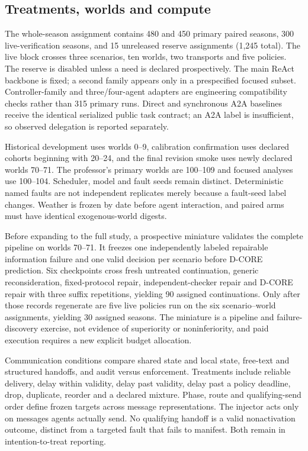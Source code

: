 \documentclass[sigconf,anonymous]{aamas}
\begin{document}
\subsection{Treatments, worlds and compute}
The whole-season assignment contains 480 and 450 primary paired seasons, 300 live-verification seasons, and 15 unreleased reserve assignments (1,245 total). The live block crosses three scenarios, ten worlds, two transports and five policies. The reserve is disabled unless a need is declared prospectively. The main ReAct backbone is fixed; a second family appears only in a prespecified focused subset. Controller-family and three/four-agent adapters are engineering compatibility checks rather than 315 primary runs. Direct and synchronous A2A baselines receive the identical serialized public task contract; an A2A label is insufficient, so observed delegation is reported separately.

Historical development uses worlds 0--9, calibration confirmation uses declared cohorts beginning with 20--24, and the final revision smoke uses newly declared worlds 70--71. The professor's primary worlds are 100--109 and focused analyses use 100--104. Scheduler, model and fault seeds remain distinct. Deterministic named faults are not independent replicates merely because a fault-seed label changes. Weather is frozen by date before agent interaction, and paired arms must have identical exogenous-world digests.

Before expanding to the full study, a prospective miniature validates the complete pipeline on worlds 70--71. It freezes one independently labeled repairable information failure and one valid decision per scenario before D-CORE prediction. Six checkpoints cross fresh untreated continuation, generic reconsideration, fixed-protocol repair, independent-checker repair and D-CORE repair with three suffix repetitions, yielding 90 assigned continuations. Only after those records regenerate are five live policies run on the six scenario--world assignments, yielding 30 assigned seasons. The miniature is a pipeline and failure-discovery exercise, not evidence of superiority or noninferiority, and paid execution requires a new explicit budget allocation.

Communication conditions compare shared state and local state, free-text and structured handoffs, and audit versus enforcement. Treatments include reliable delivery, delay within validity, delay past validity, delay past a policy deadline, drop, duplicate, reorder and a declared mixture. Phase, route and qualifying-send order define frozen targets across message representations. The injector acts only on messages agents actually send. No qualifying handoff is a valid nonactivation outcome, distinct from a targeted fault that fails to manifest. Both remain in intention-to-treat reporting.
\end{document}
